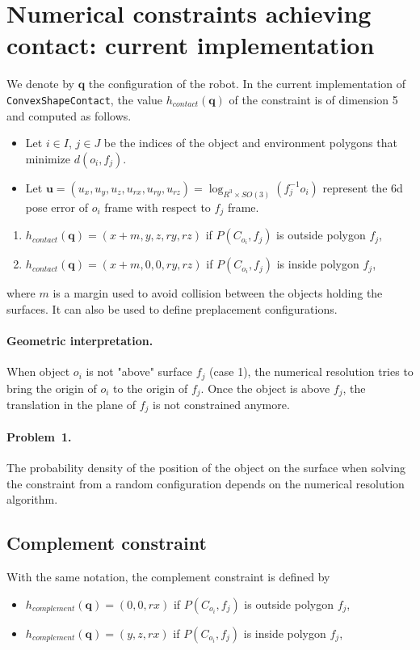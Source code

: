 \documentclass {article}
\newcommand\conf{\mathbf{q}}
\begin{document}
\section{Numerical constraints achieving contact: current implementation}
\label{eq:current implementation}

We denote by $\conf$ the configuration of the robot. In the current
implementation of \texttt{ConvexShapeContact}, the value
$h_{contact}(\conf)$ of the constraint is of dimension 5 and computed
as follows.
\begin{itemize}
\item Let $i\in I$, $j\in J$ be the indices of the object and
  environment polygons that minimize $d (o_i, f_j)$.
\item Let $\mathbf{u} = (u_x,u_y,u_z,u_{rx},u_{ry},u_{rz}) = \log_{R^3\times SO(3)}(f_j^{-1} o_{i})$ represent the 6d pose
  error of $o_i$ frame with respect to $f_j$ frame.
\end{itemize}
\begin{enumerate}
  \item $h_{contact}(\conf) = (x+m,y,z,ry,rz)$ if $P(C_{o_i},f_j)$ is outside
    polygon $f_j$,
  \item $h_{contact}(\conf) = (x+m,0,0,ry,rz)$ if $P(C_{o_i},f_j)$ is inside polygon $f_j$,
\end{enumerate}
where $m$ is a margin used to avoid collision between the objects holding the
surfaces. It can also be used to define preplacement configurations.

\paragraph{Geometric interpretation.} When object $o_i$ is not "above" surface $f_j$ (case 1), the numerical resolution tries to bring the origin of $o_i$ to the origin of $f_j$. Once the object is above $f_j$, the translation in the plane of $f_j$ is not constrained anymore.

\paragraph{Problem~1.} The probability density of the position of the object on the surface when solving the constraint from a random configuration depends on the numerical resolution algorithm.

\subsection{Complement constraint}
With the same notation, the complement constraint is defined by
\begin{itemize}
  \item $h_{complement}(\conf) = (0,0,rx)$ if $P(C_{o_i},f_j)$ is outside polygon $f_j$,
  \item $h_{complement}(\conf) = (y,z,rx)$ if $P(C_{o_i},f_j)$ is inside polygon $f_j$,
\end{itemize}
\end{document}
